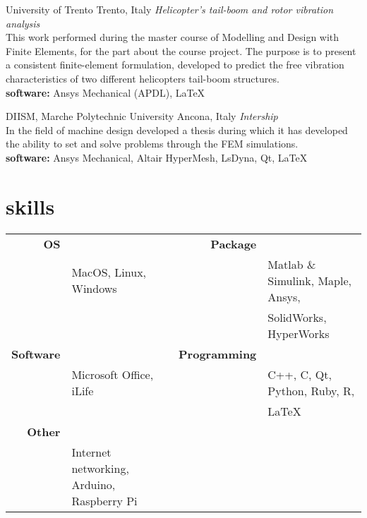 \documentclass[]{friggeri-cv} %
\begin{document}
\begin{entrylist}     
    {University of Trento}
    {Trento, Italy}
    {\emph{Helicopter's tail-boom and rotor vibration analysis}\\
    This work performed during the master course of Modelling and Design with Finite
    Elements, for the part about the course project.
    The purpose is to present a consistent finite-element
    formulation, developed to predict the free vibration characteristics of two
    different helicopters tail-boom structures.\\
    \textbf{software: } Ansys Mechanical (APDL), \LaTeX \quad
    \href{https://github.com/frank1789/FEM-Analysis---Helicopter-s-Tail}{\faGithub}}
      
      
    {DIISM, Marche Polytechnic University}
    {Ancona, Italy}
    {\emph{Intership}\\
    In the field of machine design developed a thesis during which it
    has developed the ability to set and solve problems through the FEM simulations.\\
    \textbf{software: } Ansys Mechanical, Altair  HyperMesh, LsDyna, Qt, \LaTeX \quad
    \href{https://github.com/frank1789/LsDynaToAPDL}{\faGithub}}
      
    
  \end{entrylist}

\section{skills}

\begin{tabular}{rlrl}
\textbf{OS} && \textbf{Package}\\
& MacOS, Linux, Windows  &&  Matlab \& Simulink, Maple, Ansys,\\ &&& SolidWorks, HyperWorks \\
\textbf{Software} && \textbf{Programming}\\
&Microsoft Office, iLife &&  C++,  C, Qt, Python, Ruby, R, \\ &&&\LaTeX{} \\
\textbf{Other}\\
&Internet networking, Arduino, Raspberry Pi\\
\end{tabular}\\
\end{document}
